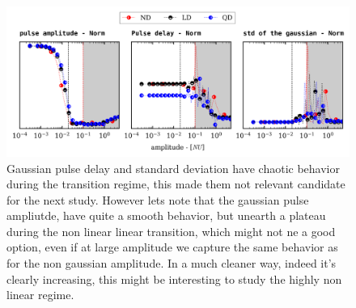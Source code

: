 \documentclass[11pt,a4paper]{report}
\begin{document}
\begin{figure}[H]
    \centering
    \includegraphics[width=1\linewidth]{./figures/gaussian_Params.png}
    \caption{Gaussian pulse delay and standard deviation have chaotic behavior during the transition regime, this made them not relevant candidate for the next study. However lets note that the gaussian pulse ampliutde,
        have quite a smooth behavior, but unearth a plateau during the non linear linear transition, which might not ne a good option, even if at large amplitude we capture the same behavior as for the non gaussian amplitude.
        In a much cleaner way, indeed it's clearly increasing, this might be interesting to study the highly non linear regime.}
    \label{}
\end{figure}
\end{document}
